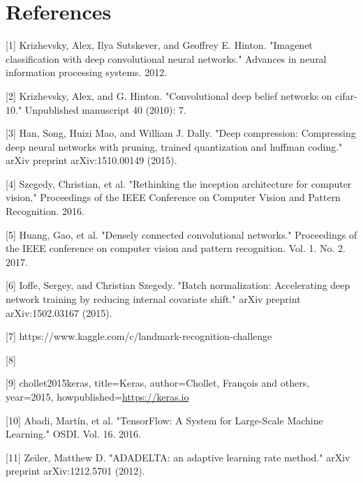 \documentclass{article}
\begin{document}
\section*{References}


[1] Krizhevsky, Alex, Ilya Sutskever, and Geoffrey E. Hinton. "Imagenet classification with deep convolutional neural networks." Advances in neural information processing systems. 2012.

[2] Krizhevsky, Alex, and G. Hinton. "Convolutional deep belief networks on cifar-10." Unpublished manuscript 40 (2010): 7.

[3] Han, Song, Huizi Mao, and William J. Dally. "Deep compression: Compressing deep neural networks with pruning, trained quantization and huffman coding." arXiv preprint arXiv:1510.00149 (2015).

[4] Szegedy, Christian, et al. "Rethinking the inception architecture for computer vision." Proceedings of the IEEE Conference on Computer Vision and Pattern Recognition. 2016.

[5] Huang, Gao, et al. "Densely connected convolutional networks." Proceedings of the IEEE conference on computer vision and pattern recognition. Vol. 1. No. 2. 2017.

[6] Ioffe, Sergey, and Christian Szegedy. "Batch normalization: Accelerating deep network training by reducing internal covariate shift." arXiv preprint arXiv:1502.03167 (2015).

[7] https://www.kaggle.com/c/landmark-recognition-challenge

[8] 

[9] chollet2015keras,
title={Keras},
author={Chollet, Fran\c{c}ois and others},
year={2015},
howpublished={\url{https://keras.io}}

[10] Abadi, Martín, et al. "TensorFlow: A System for Large-Scale Machine Learning." OSDI. Vol. 16. 2016.

[11] Zeiler, Matthew D. "ADADELTA: an adaptive learning rate method." arXiv preprint arXiv:1212.5701 (2012).
\end{document}
